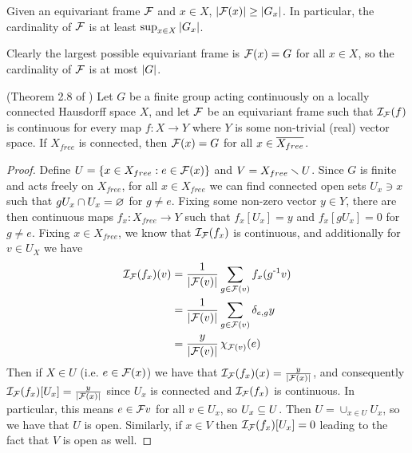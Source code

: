 \begin{corollary}\label{cor:frame-card-lower-bound}
    Given an equivariant frame $\mathcal{F}$ and $x \in X$, $\left| \mathcal{F}(x) \right| \geq \left| G_x \right|$.
    In particular, the cardinality of $\mathcal{F}$ is at least $\sup_{x \in X} \left| G_x \right|$.
\end{corollary}

\begin{remark}\label{rem:frame-card-upper-bound}
    Clearly the largest possible equivariant frame is $\mathcal{F}(x) = G$ for all $x \in X$, so the cardinality of $\mathcal{F}$ is at most $\left| G \right|$.
\end{remark}


\begin{theorem}\label{thm:finite-group-metric-frame}
    (Theorem 2.8 of \cite{dym2024equivariant})
    Let $G$ be a finite group acting continuously on a locally connected Hausdorff space $X$, and let $\mathcal{F}$ be an equivariant frame such that $\mathcal{I}_{\mathcal{F}} (f)$ is continuous for every map $f : X \to Y$ where $Y$ is some non-trivial (real) vector space.
    If $X_{free}$ is connected, then $\mathcal{F}(x) = G$ for all $x \in \overline{X_{free}}$.
    \begin{proof}
        Define $U = \left\{ x \in X_{free} : e \in \mathcal{F}(x) \right\}$ and $V = X_{free} \smallsetminus U$.
        Since $G$ is finite and acts freely on $X_{free}$, for all $x \in X_{free}$ we can find connected open sets $U_x \ni x$ such that $gU_x \cap U_x = \varnothing$ for $g \neq e$.
        Fixing some non-zero vector $y \in Y$, there are then continuous maps $f_x : X_{free} \to Y$ such that $f_x[U_x] = y$ and $f_x[gU_x] = 0$ for $g \neq e$.
        Fixing $x \in X_{free}$, we know that $\mathcal{I}_{\mathcal{F}} (f_x)$ is continuous, and additionally for $v \in U_X$ we have
        \begin{align*}
            \mathcal{I}_{\mathcal{F}} (f_x) (v)
            &= \frac{1}{\left| \mathcal{F}(v) \right|} \sum_{g \in \mathcal{F}(v)} f_x(g^{\text{-}1} v) \\
            &= \frac{1}{\left| \mathcal{F}(v) \right|} \sum_{g \in \mathcal{F}(v)} \delta_{e,g} y \\
            &= \frac{y}{\left| \mathcal{F}(v) \right|} \operatorname{\chi}_{\mathcal{F}(v)}(e)
        \end{align*}
        Then if $X \in U$ (i.e. $e \in \mathcal{F}(x)$) we have that $\mathcal{I}_{\mathcal{F}}(f_x)(x) = \frac{y}{\left| \mathcal{F}(x) \right|}$, and consequently $\mathcal{I}_{\mathcal{F}} (f_x) [U_x] = \frac{y}{\left| \mathcal{F}(x) \right|}$ since $U_x$ is connected and $\mathcal{I}_{\mathcal{F}} (f_x)$ is continuous.
        In particular, this means $e \in \mathcal{F}{v}$ for all $v \in U_x$, so $U_x \subseteq U$.
        Then $U = \cup_{x \in U} U_x$, so we have that $U$ is open.
        Similarly, if $x \in V$ then $\mathcal{I}_{\mathcal{F}} (f_x) [U_x] = 0$ leading to the fact that $V$ is open as well.


\end{proof}
\end{theorem}
